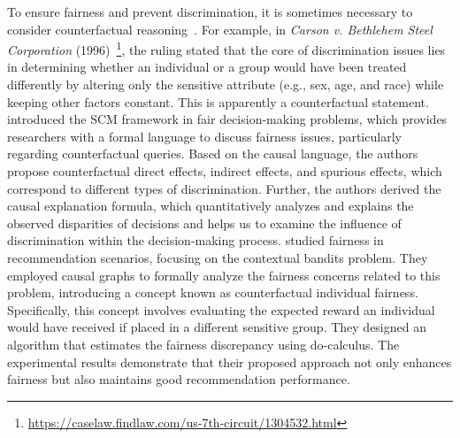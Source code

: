 \documentclass[10pt]{article} %
\theoremstyle{definition}
\begin{document}
To ensure fairness and prevent discrimination, it is sometimes necessary to consider counterfactual reasoning~\citep[Chapter~9]{pleckoCausalFairnessAnalysis2022,pearlBookWhyNew2018}. 
For example, in \emph{Carson v. Bethlehem Steel Corporation} (1996)~\footnote{\url{https://caselaw.findlaw.com/us-7th-circuit/1304532.html}}, the ruling stated that the core of discrimination issues lies in determining whether an individual or a group would have been treated differently by altering only the sensitive attribute (e.g., sex, age, and race) while keeping other factors constant. 
This is apparently a counterfactual statement. 
\citet{zhangFairnessDecisionMakingCausal2018} introduced the SCM framework in fair decision-making problems, which provides researchers with a formal language to discuss fairness issues, particularly regarding counterfactual queries. Based on the causal language, the authors propose counterfactual direct effects, indirect effects, and spurious effects, which correspond to different types of discrimination. Further, the authors derived the causal explanation formula, which quantitatively analyzes and explains the observed disparities of decisions and helps us to examine the influence of discrimination within the decision-making process.
\citet{huangAchievingCounterfactualFairness2022a} studied fairness in recommendation scenarios, focusing on the contextual bandits problem. They employed causal graphs to formally analyze the fairness concerns related to this problem, introducing a concept known as counterfactual individual fairness. Specifically, this concept involves evaluating the expected reward an individual would have received if placed in a different sensitive group. They designed an algorithm that estimates the fairness discrepancy using do-calculus. The experimental results demonstrate that their proposed approach not only enhances fairness but also maintains good recommendation performance.
\end{document}
